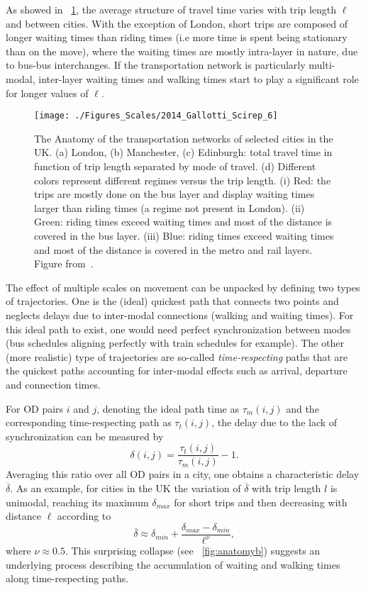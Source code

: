 As showed in \figurename~\ref{fig:anatomy}, the average structure of travel time varies with trip length $\ell$ and between cities. With the exception of London, short trips are composed of longer waiting times than riding times (i.e more time is spent being stationary than on the move), where the waiting times are mostly intra-layer in nature, due to bus-bus interchanges. If the transportation network is particularly multi-modal, inter-layer waiting times and walking times start to play a significant role for longer values of $\ell$. 

\begin{figure}[t!]
\centering
\texttt{[image: ./Figures\_Scales/2014\_Gallotti\_Scirep\_6]}
\caption{The Anatomy of the transportation networks of selected cities in the UK. (a) London, (b) Manchester, (c) Edinburgh: total travel time in function of trip length separated by mode of travel. (d) Different colors represent different regimes versus the trip length. (i) Red: the trips are mostly done on the bus layer and display waiting times larger than riding times (a regime not present in London). (ii) Green: riding times exceed waiting times and most of the distance is covered in the bus layer. (iii) Blue: riding times exceed waiting times and most of the distance is covered in the metro and rail layers. Figure from~\cite{gallotti_2014_anatomy}.}
\label{fig:anatomy}
\end{figure}

The effect of multiple scales on movement can be unpacked by defining two types of trajectories. One is the (ideal) quickest path that connects two points and neglects delays due to inter-modal connections (walking and waiting times). For this ideal path to exist, one would need perfect synchronization between modes (bus schedules aligning perfectly with train schedules for example). The other (more realistic) type of trajectories are  so-called \emph{time-respecting} paths that are the quickest paths accounting for inter-modal effects such as arrival, departure and connection times. 

For OD pairs $i$ and $j$, denoting the ideal path time as $\tau_m(i,j)$ and the corresponding time-respecting path as $\tau_t(i,j)$, the delay due to the lack of synchronization can be measured by
\begin{equation}
\delta(i,j)=\frac{\tau_t(i,j)}{\tau_m(i,j)}-1.
\end{equation}
Averaging this ratio over all OD pairs in a city, one obtains a characteristic delay $\overline{\delta}$. As an example, for cities in the UK the variation of $\overline{\delta}$ with trip length $l$ is unimodal, reaching its maximum $\delta_{max}$ for short trips and then decreasing with distance $\ell$ according to 
\begin{equation}
\overline{\delta} \approx \delta_{min} + \frac{\delta_{max}-\delta_{min}}{\ell^\nu},
\label{eq:deltafun}
\end{equation}
where $\nu\approx 0.5$. This surprising collapse (see \figurename~\ref{fig:anatomyb}) suggests an underlying process describing the accumulation of waiting and walking times along time-respecting paths.

